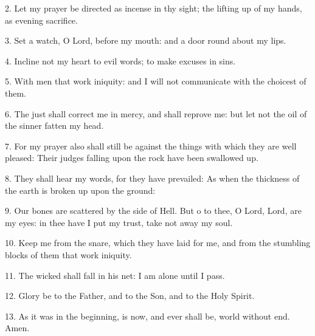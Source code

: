2. Let my prayer be directed as incense in thy sight; the lifting up of my hands, as evening sacrifice.
	
3. Set a watch, O Lord, before my mouth: and a door round about my lips.

4. Incline not my heart to evil words; to make excuses in sins. 

5. With men that work iniquity: and I will not communicate with the choicest of them.

6. The just shall correct me in mercy, and shall reprove me: but let not the oil of the sinner fatten my head. 

7. For my prayer also shall still be against the things with which they are well pleased: Their judges falling upon the rock have been swallowed up. 

8. They shall hear my words, for they have prevailed: As when the thickness of the earth is broken up upon the ground: 

9. Our bones are scattered by the side of Hell. But o to thee, O Lord, Lord, are my eyes: in thee have I put my trust, take not away my soul.

10. Keep me from the snare, which they have laid for me, and from the stumbling blocks of them that work iniquity.

11. The wicked shall fall in his net: I am alone until I pass.

12. Glory be to the Father, and to the Son, and to the Holy Spirit.
 	
13. As it was in the beginning, is now, and ever shall be, world without end. Amen.